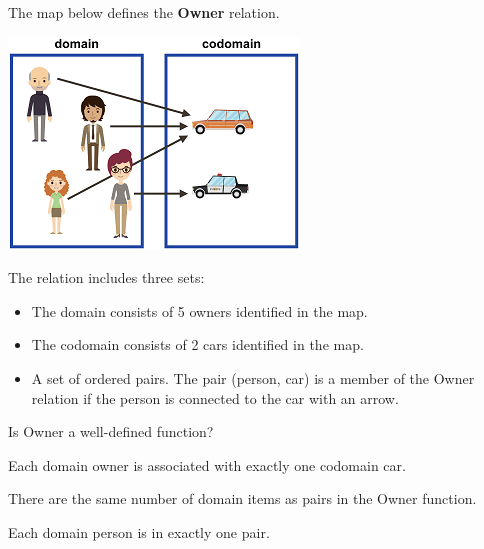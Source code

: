 \documentclass{ximera}
\begin{document}
\begin{definition}
  The map below defines the \textbf{Owner} relation. 
  
  

    \includegraphics[width=292px,height=213px]{pics/r30.png}

  
 

  The  relation includes three sets:
    \begin{itemize}
    \item The domain consists of 5 owners identified in the map.
    \item The codomain consists of 2 cars identified in the map.
    \item A set of ordered pairs. The pair (person, car) is a member of the Owner relation if the person is connected to the car with an arrow.
    \end{itemize}

  
  
\end{definition}













\begin{exercise}
Is Owner a well-defined function?
  \begin{multipleChoice}
  \end{multipleChoice}
  \begin{feedback}
Each domain owner is associated with exactly one codomain car.
  \end{feedback}
\end{exercise}






\begin{exercise}
There are the same number of domain items as pairs in the Owner function.
  \begin{multipleChoice}
  \end{multipleChoice}
  \begin{feedback}
Each domain person is in exactly one pair.
  \end{feedback}
\end{exercise}
\end{document}
